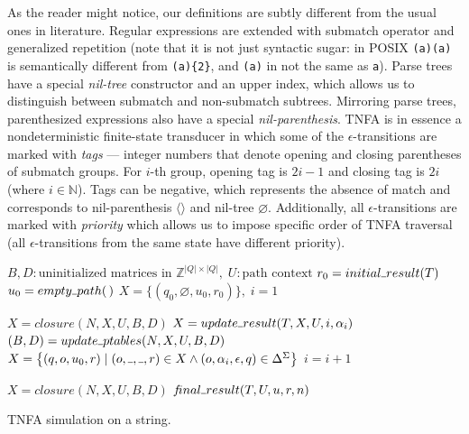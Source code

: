 \documentclass[AMA,STIX1COL]{WileyNJD-v2}
\newcommand{\Xm}{\langle\!\rangle}
\newcommand{\Xund}{\rule{.4em}{.4pt}}
\newcommand{\YN}{\mathbb{N}}
\newcommand{\YZ}{\mathbb{Z}}
\begin{document}
As the reader might notice, our definitions are subtly different from the usual ones in literature.
Regular expressions are extended with submatch operator
and generalized repetition (note that it is not just syntactic sugar: in POSIX \texttt{(a)(a)} is semantically different from \texttt{(a)\{2\}},
and \texttt{(a)} in not the same as \texttt{a}).
Parse trees have a special \emph{nil-tree} constructor
and an upper index, which allows us to distinguish between submatch and non-submatch subtrees.
Mirroring parse trees, parenthesized expressions also have a special \emph{nil-parenthesis}.
TNFA is in essence a nondeterministic finite-state transducer
in which some of the $\epsilon$-transitions are marked with \emph{tags} ---
integer numbers that denote opening and closing parentheses of submatch groups.
For $i$-th group, opening tag is $2i - 1$ and closing tag is $2i$ (where $i \in \YN$).
Tags can be negative, which represents the absence of match and corresponds to nil-parenthesis $\Xm$ and nil-tree $\varnothing$.
Additionally, all $\epsilon$-transitions are marked with \emph{priority}
which allows us to impose specific order of TNFA traversal
(all $\epsilon$-transitions from the same state have different priority).
\\

\begin{algorithm}[H] \DontPrintSemicolon {} 
 {

    $B, D : \text{uninitialized matrices in } \YZ^{|Q| \times |Q|}, \; U: \text{path context}$ \;
    $r_0 = initial \Xund result(T)$ \;
    $u_0 = empty \Xund path(\,)$ \;
    $X = \big\{ (q_0, \varnothing, u_0, r_0) \big\}, \; i = 1$ \;

    \BlankLine
     {
        $X = closure(N, X, U, B, D)$ \;
        $X = update \Xund result(T, X, U, i, \alpha_i)$ \;
        $(B, D) = update \Xund ptables(N, X, U, B, D)$ \;
        $X = \big\{ (q, o, u_0, r) \mid (o, \Xund, \Xund, r) \in X \wedge (o, \alpha_i, \epsilon, q) \in \Delta^\Sigma \big\}$ \;
        $i = i + 1$ \;
    }

    \BlankLine
    $X = closure(N, X, U, B, D)$ \;
    \If {$(q_f, \Xund, u, r) \in X$} {
        \Return $f\!inal \Xund result (T, U, u, r, n)$
    } \lElse {
        \Return $\varnothing$
    }

    \BlankLine
}
\caption{TNFA simulation on a string.}\label{alg_match}
\end{algorithm}
\medskip
\end{document}

